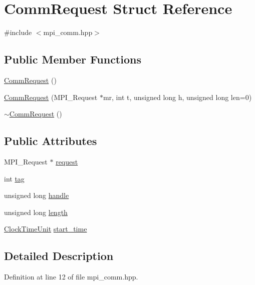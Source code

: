 \hypertarget{struct_comm_request}{
\section{CommRequest Struct Reference}
\label{struct_comm_request}
}


{\ttfamily \#include $<$mpi\_\-comm.hpp$>$}\subsection*{Public Member Functions}
\begin{DoxyCompactItemize}
\item 
\hyperlink{struct_comm_request_a43ae409cb5a60a94d3bcf4c9cc251e6d}{CommRequest} ()
\item 
\hyperlink{struct_comm_request_a6f7d4a9e54cd82b411839f4703372fd5}{CommRequest} (MPI\_\-Request $\ast$mr, int t, unsigned long h, unsigned long len=0)
\item 
\hyperlink{struct_comm_request_a78280275ce91ac1ba72600ad40f54190}{$\sim$CommRequest} ()
\end{DoxyCompactItemize}
\subsection*{Public Attributes}
\begin{DoxyCompactItemize}
\item 
MPI\_\-Request $\ast$ \hyperlink{struct_comm_request_a4d9440cc14522bec4bb1fe8a13fd5bae}{request}
\item 
int \hyperlink{struct_comm_request_abeba1f79be1735c03e634f4b2e3c29fb}{tag}
\item 
unsigned long \hyperlink{struct_comm_request_a8fc33aa63e2da5b320bdfb3488fd627b}{handle}
\item 
unsigned long \hyperlink{struct_comm_request_acf0a1b3dfa261a69aa05c31d4e208fbc}{length}
\item 
\hyperlink{basic_8hpp_ab6fdc9dc4abc71f4bdf430a00f9661c8}{ClockTimeUnit} \hyperlink{struct_comm_request_a431a5e6f63bc0a065f9a6c8009ccb1a1}{start\_\-time}
\end{DoxyCompactItemize}


\subsection{Detailed Description}


Definition at line 12 of file mpi\_\-comm.hpp.

